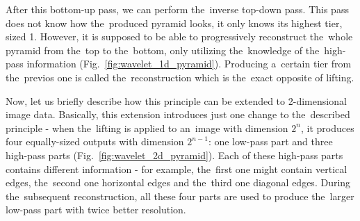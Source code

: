 After this bottom-up pass, we can perform the~inverse top-down pass. This pass does not know how the~produced pyramid looks, it only knows its highest tier, sized 1. However, it is supposed to be able to progressively reconstruct the~whole pyramid from the~top to the~bottom, only utilizing the~knowledge of the~high-pass information (Fig.~\ref{fig:wavelet_1d_pyramid}). Producing a~certain tier from the~previos one is called the~reconstruction which is the~exact opposite of lifting.

Now, let us briefly describe how this principle can be extended to 2-dimensional image data. Basically, this extension introduces just one change to the~described principle - when the~lifting is applied to an~image with dimension $2^n$, it produces four equally-sized outputs with dimension $2^{n-1}$: one low-pass part and three high-pass parts (Fig.~\ref{fig:wavelet_2d_pyramid}). Each of these high-pass parts contains different information - for example, the~first one might contain vertical edges, the~second one horizontal edges and the~third one diagonal edges. During the~subsequent reconstruction, all these four parts are used to produce the~larger low-pass part with twice better resolution.


